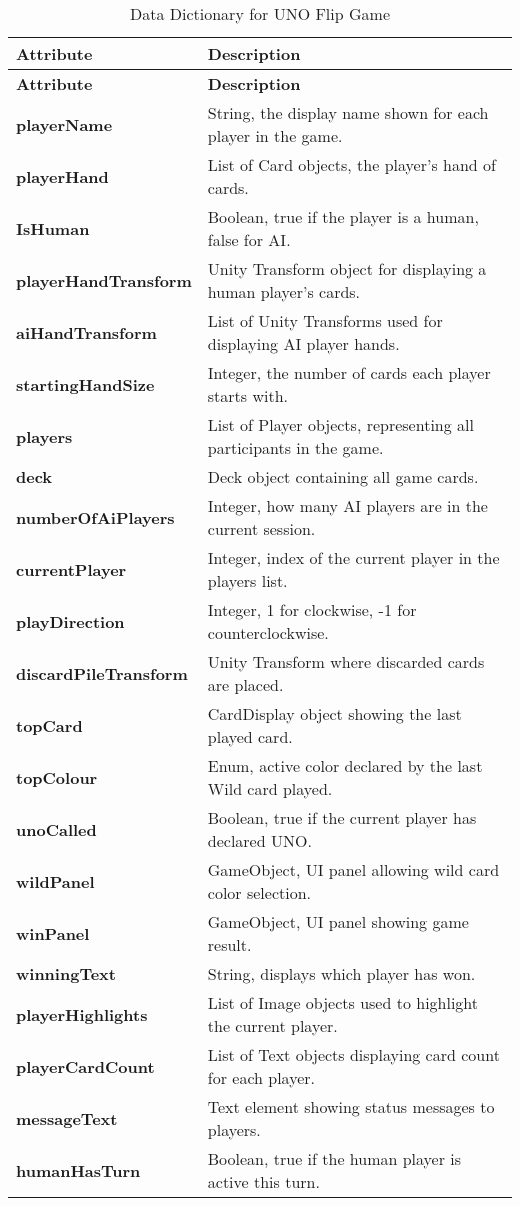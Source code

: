 
\begin{longtable}{|p{4cm}|p{11cm}|}
\caption{Data Dictionary for UNO Flip Game} \label{tab:data-dictionary} \\
\hline
\textbf{Attribute} & \textbf{Description} \\
\hline
\endfirsthead
\hline
\textbf{Attribute} & \textbf{Description} \\
\hline
\endhead
\hline
\endfoot
\hline
\endlastfoot

\textbf{playerName} & String, the display name shown for each player in the game. \\
\textbf{playerHand} & List of Card objects, the player's hand of cards. \\
\textbf{IsHuman} & Boolean, true if the player is a human, false for AI. \\
\textbf{playerHandTransform} & Unity Transform object for displaying a human player's cards. \\
\textbf{aiHandTransform} & List of Unity Transforms used for displaying AI player hands. \\
\textbf{startingHandSize} & Integer, the number of cards each player starts with. \\

\textbf{players} & List of Player objects, representing all participants in the game. \\
\textbf{deck} & Deck object containing all game cards. \\
\textbf{numberOfAiPlayers} & Integer, how many AI players are in the current session. \\
\textbf{currentPlayer} & Integer, index of the current player in the players list. \\
\textbf{playDirection} & Integer, 1 for clockwise, -1 for counterclockwise. \\
\textbf{discardPileTransform} & Unity Transform where discarded cards are placed. \\
\textbf{topCard} & CardDisplay object showing the last played card. \\
\textbf{topColour} & Enum, active color declared by the last Wild card played. \\
\textbf{unoCalled} & Boolean, true if the current player has declared UNO. \\
\textbf{wildPanel} & GameObject, UI panel allowing wild card color selection. \\
\textbf{winPanel} & GameObject, UI panel showing game result. \\
\textbf{winningText} & String, displays which player has won. \\
\textbf{playerHighlights} & List of Image objects used to highlight the current player. \\
\textbf{playerCardCount} & List of Text objects displaying card count for each player. \\
\textbf{messageText} & Text element showing status messages to players. \\
\textbf{humanHasTurn} & Boolean, true if the human player is active this turn. \\


\end{longtable}
